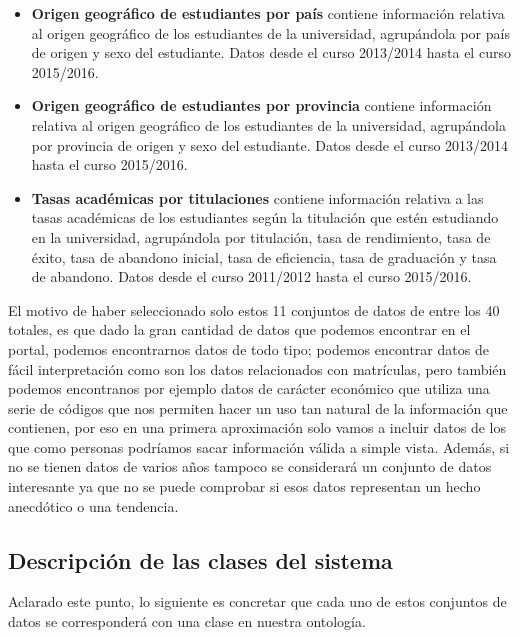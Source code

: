 \begin{itemize}
	\item \textbf{Origen geográfico de estudiantes por país} contiene información relativa al origen geográfico de los estudiantes de la universidad, agrupándola por país de origen y sexo del estudiante. Datos desde el curso 2013/2014 hasta el curso 2015/2016.
	\item \textbf{Origen geográfico de estudiantes por provincia} contiene información relativa al origen geográfico de los estudiantes de la universidad, agrupándola por provincia de origen y sexo del estudiante. Datos desde el curso 2013/2014 hasta el curso 2015/2016.
	\item \textbf{Tasas académicas por titulaciones} contiene información relativa a las tasas académicas de los estudiantes según la titulación que estén estudiando en la universidad, agrupándola por titulación, tasa de rendimiento, tasa de éxito, tasa de abandono inicial, tasa de eficiencia, tasa de graduación y tasa de abandono. Datos desde el curso 2011/2012 hasta el curso 2015/2016.
\end{itemize}

El motivo de haber seleccionado solo estos 11 conjuntos de datos de entre los 40 totales, es que dado la gran cantidad de datos que podemos encontrar en el portal, podemos encontrarnos datos de todo tipo; podemos encontrar datos de fácil interpretación como son los datos relacionados con matrículas, pero también podemos encontranos por ejemplo datos de carácter económico que utiliza una serie de códigos que nos permiten hacer un uso tan natural de la información que contienen, por eso en una primera aproximación solo vamos a incluir datos de los que como personas podríamos sacar información válida a simple vista. Además, si no se tienen datos de varios años tampoco se considerará un conjunto de datos interesante ya que no se puede comprobar si esos datos representan un hecho anecdótico o una tendencia.

\newpage
\subsection{Descripción de las clases del sistema}

Aclarado este punto, lo siguiente es concretar que cada uno de estos conjuntos de datos se corresponderá con una clase en nuestra ontología.

